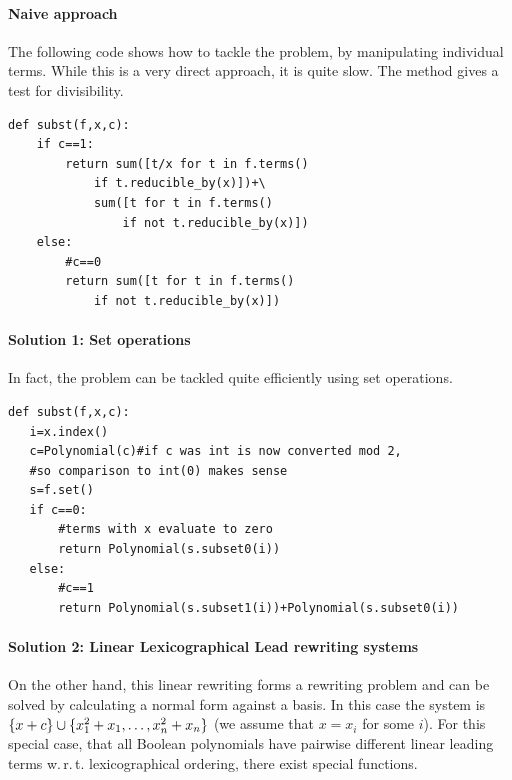 \paragraph{Naive approach}
The following code shows how to tackle the problem, by manipulating individual terms.
While this is a very direct approach, it is quite slow.
The method  gives a test for divisibility.
\begin{lstlisting}
def subst(f,x,c):
    if c==1:
        return sum([t/x for t in f.terms() 
            if t.reducible_by(x)])+\
            sum([t for t in f.terms() 
                if not t.reducible_by(x)])
    else:
        #c==0
        return sum([t for t in f.terms() 
            if not t.reducible_by(x)])

\end{lstlisting}

\paragraph{Solution 1: Set operations}
In fact, the problem can be tackled quite efficiently using set operations.
\begin{lstlisting}
def subst(f,x,c):
   i=x.index()
   c=Polynomial(c)#if c was int is now converted mod 2, 
   #so comparison to int(0) makes sense
   s=f.set()
   if c==0:
       #terms with x evaluate to zero
       return Polynomial(s.subset0(i))
   else:
       #c==1
       return Polynomial(s.subset1(i))+Polynomial(s.subset0(i))    
\end{lstlisting}

\paragraph{Solution 2: Linear Lexicographical Lead rewriting systems}
On the other hand, this linear rewriting forms a rewriting problem and can be solved by calculating a normal form against a \Groebner 
basis.
In this case the system is $\{x+c\} \cup \{{x_1^2+x_1,\ldots,x_n^2+x_n}\}$ (we assume that $x=x_i$ for some $i$).
For this special case, that all Boolean polynomials have pairwise different linear leading terms w.\,r.\,t. lexicographical ordering,
there exist special functions.

